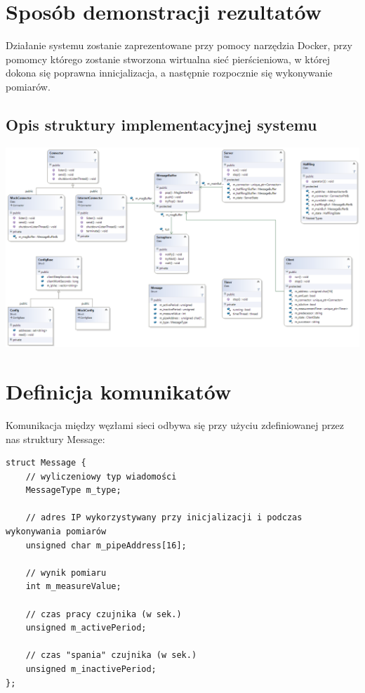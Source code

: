 \documentclass[a4paper,11pt]{article}
\begin{document}
\section{Sposób demonstracji rezultatów}
Działanie systemu zostanie zaprezentowane przy pomocy narzędzia Docker,
przy pomomcy którego zostanie stworzona wirtualna sieć pierścieniowa, w której dokona się poprawna innicjalizacja, a następnie rozpocznie się wykonywanie pomiarów.


\begin{landscape}
  \pagestyle{empty}
  \section{Opis struktury implementacyjnej systemu}

\begin{center}
    \centerline{\includegraphics[width=1.4\textwidth]{class_diagram}}
\end{center}
\end{landscape}
\newpage


\section{Definicja komunikatów}
Komunikacja między węzłami sieci odbywa się przy użyciu zdefiniowanej przez nas
struktury Message:

\begin{verbatim}
struct Message {
    // wyliczeniowy typ wiadomości
    MessageType m_type;

    // adres IP wykorzystywany przy inicjalizacji i podczas wykonywania pomiarów
    unsigned char m_pipeAddress[16];

    // wynik pomiaru
    int m_measureValue;

    // czas pracy czujnika (w sek.)
    unsigned m_activePeriod;

    // czas "spania" czujnika (w sek.)
    unsigned m_inactivePeriod;
};
\end{verbatim}
\end{document}
